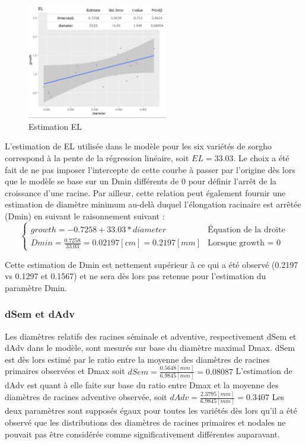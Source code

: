 \begin{figure}[ht]
\centering
\includegraphics[width=0.55\textwidth]{Image/EL.png}
\caption{Estimation EL}
\label{fig:EL}
\end{figure}

L'estimation de EL utilisée dans le modèle pour les six variétés de sorgho correspond à la pente de la régression linéaire, soit $EL= 33.03$.
Le choix a été fait de ne pas imposer l'intercepte de cette courbe à passer par l'origine dès lors que le modèle se base sur un Dmin différents de 0 pour définir l'arrêt de la croissance d'une racine.
Par ailleur, cette relation peut également fournir une estimation de diamètre minimum au-delà duquel l'élongation racinaire est arrêtée (Dmin) en suivant le raisonnement suivant :
\begin{equation}
    \begin{cases}
        growth = -0.7258 + 33.03*diameter & \text{Équation de la droite} \\
        Dmin = \frac{0.7258}{33.03} = 0.02197 [cm] = 0.2197 [mm] & \text{Lorsque growth = 0}
    \end{cases}
\end{equation}

Cette estimation de Dmin est nettement supérieur à ce qui a été observé (0.2197 vs 0.1297 et 0.1567) et ne sera dès lors pas retenue pour l'estimation du paramètre Dmin.

\subsubsection{dSem et dAdv}

Les diamètres relatifs des racines séminale et adventive, respectivement dSem et dAdv dans le modèle, sont mesurés sur base du diamètre maximal Dmax.
dSem est dès lors estimé par le ratio entre la moyenne des diamètres de racines primaires observées et Dmax soit $dSem=\frac{0.5648[mm]}{6.9845[mm]} = 0.08087$
L'estimation de dAdv est quant à elle faite sur base du ratio entre Dmax et la moyenne des diamètres de racines adventive observée, soit $dAdv = \frac{2.3795[mm]}{6.9845[mm]} = 0.3407$
Les deux paramètres sont supposés égaux pour toutes les variétés dès lors qu'il a été observé que les distributions des diamètres de racines primaires et nodales ne pouvait pas être considérée comme significativement différentes auparavant.

